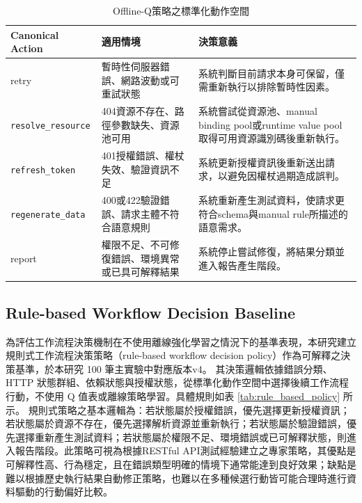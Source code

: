 \begin{ZhChapter}
\begin{table}[H]
\centering
\caption{Offline-Q策略之標準化動作空間}
\label{tab:offline_q_action_space}
\scriptsize
\renewcommand{\arraystretch}{1.4}
\begin{tabularx}{\textwidth}{p{3.2cm} p{5.0cm} X} %
\toprule
\textbf{Canonical Action} & \textbf{適用情境} & \textbf{決策意義} \\
\midrule
retry & 暫時性伺服器錯誤、網路波動或可重試狀態 & 系統判斷目前請求本身可保留，僅需重新執行以排除暫時性因素。 \\
\texttt{resolve\_resource} & 404資源不存在、路徑參數缺失、資源池可用 & 系統嘗試從資源池、manual binding pool或runtime value pool取得可用資源識別碼後重新執行。 \\
\texttt{refresh\_token} & 401授權錯誤、權杖失效、驗證資訊不足 & 系統更新授權資訊後重新送出請求，以避免因權杖過期造成誤判。 \\
\texttt{regenerate\_data} & 400或422驗證錯誤、請求主體不符合語意規則 & 系統重新產生測試資料，使請求更符合schema與manual rule所描述的語意需求。 \\
report & 權限不足、不可修復錯誤、環境異常或已具可解釋結果 & 系統停止嘗試修復，將結果分類並進入報告產生階段。 \\
\bottomrule
\end{tabularx}
\end{table}


\clearpage
\subsection{Rule-based Workflow Decision Baseline}
\text 為評估工作流程決策機制在不使用離線強化學習之情況下的基準表現，本研究建立規則式工作流程決策策略（rule-based workflow decision policy）作為可解釋之決策基準，於本研究 100 筆主實驗中對應版本v4。
\text 其決策邏輯依據錯誤分類、HTTP 狀態群組、依賴狀態與授權狀態，從標準化動作空間中選擇後續工作流程行動，不使用 Q 值表或離線策略學習。具體規則如表 \ref{tab:rule_based_policy} 所示。
\text 規則式策略之基本邏輯為：若狀態屬於授權錯誤，優先選擇更新授權資訊；若狀態屬於資源不存在，優先選擇解析資源並重新執行；若狀態屬於驗證錯誤，優先選擇重新產生測試資料；若狀態屬於權限不足、環境錯誤或已可解釋狀態，則進入報告階段。此策略可視為根據RESTful API測試經驗建立之專家策略，其優點是可解釋性高、行為穩定，且在錯誤類型明確的情境下通常能達到良好效果；缺點是難以根據歷史執行結果自動修正策略，也難以在多種候選行動皆可能合理時進行資料驅動的行動偏好比較。


\end{ZhChapter}
